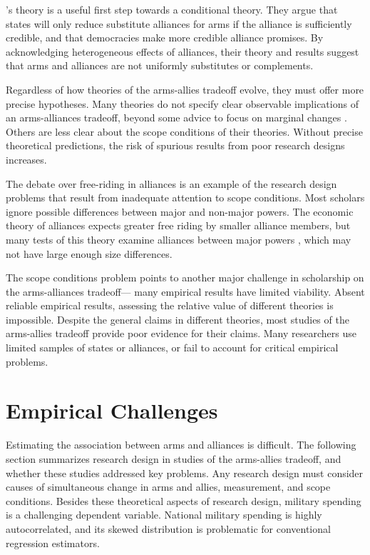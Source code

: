 \documentclass[12pt]{article}
\begin{document}
\citet{DigiuseppePoast2016}'s theory is a useful first step towards a conditional theory. They argue that states will only reduce substitute alliances for arms if the alliance is sufficiently credible, and that democracies make more credible alliance promises. By acknowledging heterogeneous effects of alliances, their theory and results suggest that arms and alliances are not uniformly substitutes or complements. 

Regardless of how theories of the arms-allies tradeoff evolve, they must offer more precise hypotheses. Many theories do not specify clear observable implications of an arms-alliances tradeoff, beyond some advice to focus on marginal changes \citep{Morrow2000, Starr2000}. Others are less clear about the scope conditions of their theories. Without precise theoretical predictions, the risk of spurious results from poor research designs increases. 

The debate over free-riding in alliances is an example of the research design problems that result from inadequate attention to scope conditions. Most scholars ignore possible differences between major and non-major powers. The economic theory of alliances expects greater free riding by smaller alliance members, but many tests of this theory examine alliances between major powers \citep{Thies1987, ConybeareSandler1990, Siroky2012}, which may not have large enough size differences.  

The scope conditions problem points to another major challenge in scholarship on the arms-alliances tradeoff--- many empirical results have limited viability. Absent reliable empirical results, assessing the relative value of different theories is impossible. Despite the general claims in different theories, most studies of the arms-allies tradeoff provide poor evidence for their claims. Many researchers use limited samples of states or alliances, or fail to account for critical empirical problems.   





\section*{Empirical Challenges}

Estimating the association between arms and alliances is difficult. The following section summarizes research design in studies of the arms-allies tradeoff, and whether these studies addressed key problems. Any research design must consider causes of simultaneous change in arms and allies, measurement, and scope conditions. Besides these theoretical aspects of research design, military spending is a challenging dependent variable. National military spending is highly autocorrelated, and its skewed distribution is problematic for conventional regression estimators. 
\end{document}
